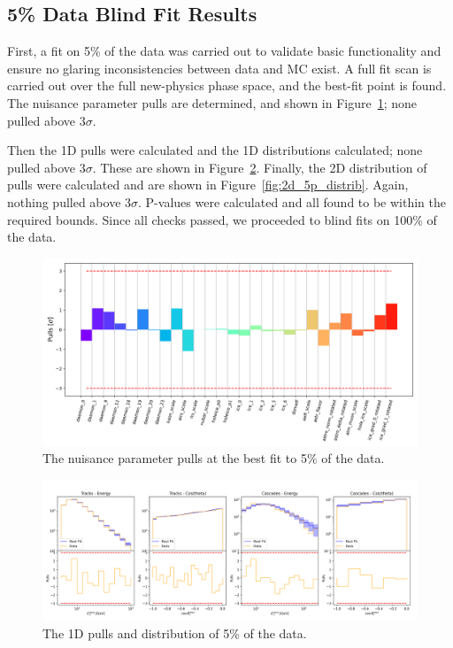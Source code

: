 \documentclass[main.tex]{subfiles}
\begin{document}
\subsection{5\% Data Blind Fit Results}

First, a fit on 5\% of the data was carried out to validate basic functionality and ensure no glaring inconsistencies between data and MC exist. 
A full fit scan is carried out over the full new-physics phase space, and the best-fit point is found. 
The nuisance parameter pulls are determined, and shown in Figure~\ref{fig:pulls_5p}; none pulled above $3\sigma$.

Then the 1D pulls were calculated and the 1D distributions calculated; none pulled above $3\sigma$. 
These are shown in Figure~\ref{fig:1d_5p_distrib}.
Finally, the 2D distribution of pulls were calculated and are shown in Figure~\ref{fig:2d_5p_distrib}.
Again, nothing pulled above $3\sigma$. 
P-values were calculated and all found to be within the required bounds. 
Since all checks passed, we proceeded to blind fits on 100\% of the data. 

\begin{figure}
    \centering
    \includegraphics[width=0.9\linewidth]{./figures/blindfit/pulls_IC86_data_five_percent_joint_data_5p_with_flavor_update_fix.png}
    \caption{The nuisance parameter pulls at the best fit to 5\% of the data.}\label{fig:pulls_5p}
\end{figure}

\begin{figure}
    \centering
    \includegraphics[width=0.9\linewidth]{./figures/blindfit/goodness_joint_data_5p_with_flavor_update_IC86_data_five_percent.png}
    \caption{The 1D pulls and distribution of 5\% of the data.}\label{fig:1d_5p_distrib}
\end{figure}
\end{document}
